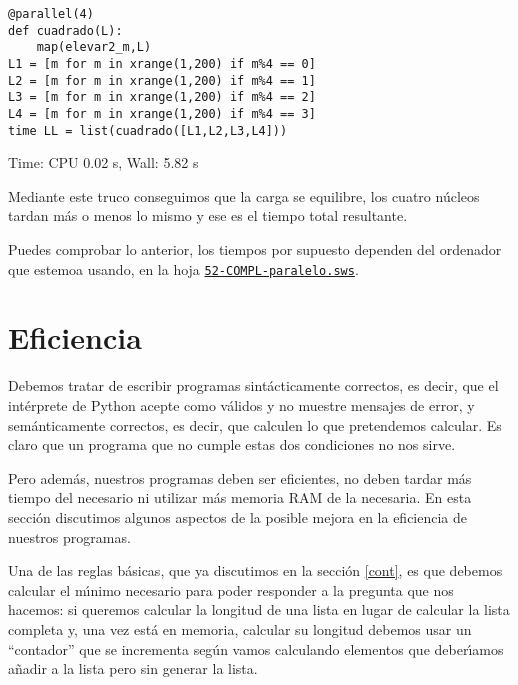 \begin{lstlisting}
@parallel(4)
def cuadrado(L):
	map(elevar2_m,L)
L1 = [m for m in xrange(1,200) if m%4 == 0]
L2 = [m for m in xrange(1,200) if m%4 == 1]
L3 = [m for m in xrange(1,200) if m%4 == 2]
L4 = [m for m in xrange(1,200) if m%4 == 3]
time LL = list(cuadrado([L1,L2,L3,L4]))
\end{lstlisting}
\begin{Output}
	Time: CPU 0.02 s, Wall: 5.82 s
\end{Output}

Mediante este truco conseguimos que la carga se equilibre, los cuatro n\'ucleos
tardan m\'as o menos lo mismo y ese es el tiempo total resultante. 

Puedes comprobar lo anterior, los tiempos por supuesto dependen del ordenador que estemoa usando, en la hoja 
\href{http://sage.mat.uam.es:8888/home/pub/9/}{\tt 52-COMPL-paralelo.sws}.





\section{Eficiencia}

Debemos tratar de escribir programas {\sc sint\'acticamente correctos}, es
decir, que el int\'erprete de Python acepte como v\'alidos y no muestre mensajes
de error, y {\sc sem\'anticamente correctos}, es decir, que calculen lo que
pretendemos calcular. Es claro que un programa que no cumple estas dos
condiciones no nos sirve.


Pero adem\'as,  nuestros programas deben ser {\sc eficientes}, no deben tardar
m\'as tiempo
del necesario ni utilizar m\'as memoria RAM de la necesaria. En esta secci\'on
discutimos algunos aspectos de la posible mejora en la eficiencia de nuestros
programas.





Una de las  reglas b\'asicas, que ya discutimos en la secci\'on \ref{cont},  es
que {\sc debemos calcular el m\'{\i}nimo
necesario para poder responder}  a la pregunta que nos hacemos: si queremos
calcular la longitud
de una lista en lugar de calcular la lista completa y, una vez est\'a en
memoria, calcular su longitud debemos usar un ``contador'' que se incrementa
seg\'un vamos calculando elementos que deber\'{\i}amos a\~nadir a la lista pero
sin generar la lista. 

